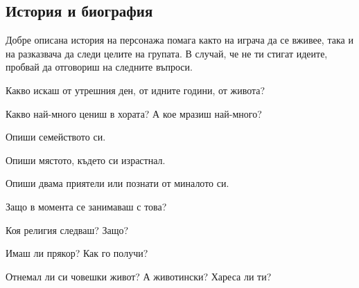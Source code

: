 \subsection{История и биография}
Добре описана история на персонажа помага както на играча да се вживее, така и на разказвача да следи целите на групата.
В случай, че не ти стигат идеите, пробвай да отговориш на следните въпроси.
\begin{itemize*}
\item{Какво искаш от утрешния ден, от идните години, от живота?}
\item{Какво най-много цениш в хората? А кое мразиш най-много?}
\item{Опиши семейството си.}
\item{Опиши мястото, където си израстнал.}
\item{Опиши двама приятели или познати от миналото си.}
\item{Защо в момента се занимаваш с това?}
\item{Коя религия следваш? Защо?}
\item{Имаш ли прякор? Как го получи?}
\item{Отнемал ли си човешки живот? А животински? Хареса ли ти?}
\end{itemize*}
